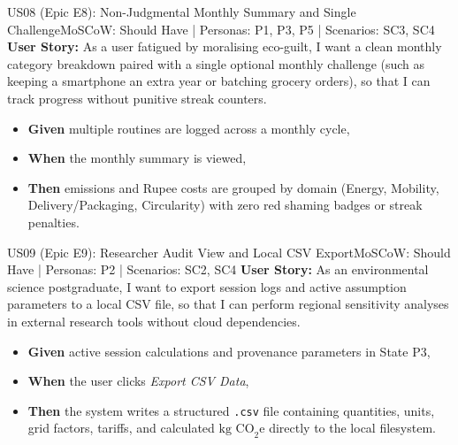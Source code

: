 \documentclass[12pt, a4paper]{article}
\begin{document}
\begin{storybox}{US08 (Epic E8): Non-Judgmental Monthly Summary and Single Challenge}{MoSCoW: Should Have | Personas: P1, P3, P5 | Scenarios: SC3, SC4}
\textbf{User Story:} As a user fatigued by moralising eco-guilt, I want a clean monthly category breakdown paired with a single optional monthly challenge (such as keeping a smartphone an extra year or batching grocery orders), so that I can track progress without punitive streak counters.
\begin{itemize}
    \item \textbf{Given} multiple routines are logged across a monthly cycle,
    \item \textbf{When} the monthly summary is viewed,
    \item \textbf{Then} emissions and Rupee costs are grouped by domain (Energy, Mobility, Delivery/Packaging, Circularity) with zero red shaming badges or streak penalties.
\end{itemize}
\end{storybox}

\begin{storybox}{US09 (Epic E9): Researcher Audit View and Local CSV Export}{MoSCoW: Should Have | Personas: P2 | Scenarios: SC2, SC4}
\textbf{User Story:} As an environmental science postgraduate, I want to export session logs and active assumption parameters to a local CSV file, so that I can perform regional sensitivity analyses in external research tools without cloud dependencies.
\begin{itemize}
    \item \textbf{Given} active session calculations and provenance parameters in State P3,
    \item \textbf{When} the user clicks \textit{Export CSV Data},
    \item \textbf{Then} the system writes a structured \texttt{.csv} file containing quantities, units, grid factors, tariffs, and calculated $\text{kg CO}_2\text{e}$ directly to the local filesystem.
\end{itemize}
\end{storybox}
\end{document}
